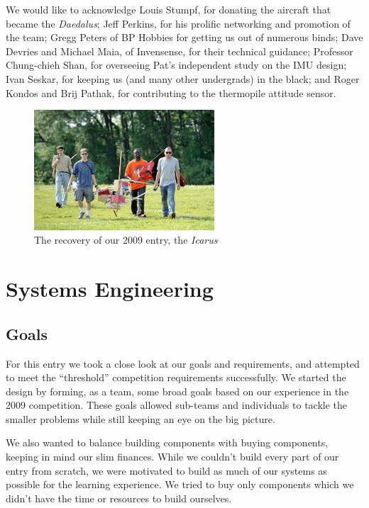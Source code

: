 \documentclass[10pt]{report}
\begin{document}
We would like to acknowledge
Louis Stumpf, for donating the aircraft that became the \emph{Daedalus};
Jeff Perkins, for his prolific networking and promotion of the team;
Gregg Peters of BP Hobbies for getting us out of numerous binds;
Dave Devries and Michael Maia, of Invensense, for their technical guidance;
Professor Chung-chieh Shan, for overseeing Pat's independent study on the IMU design;
Ivan Seskar, for keeping us (and many other undergrads) in the black; and
Roger Kondos and Brij Pathak, for contributing to the thermopile attitude sensor.

\begin{figure}[b!]
	\centering
	\includegraphics[width=0.6\textwidth]{../images/wreckage.jpg}
	\caption{The recovery of our 2009 entry, the \emph{Icarus}}
	\label{fig:wreckage}
\end{figure}

\newpage
\section{Systems Engineering}
\subsection{Goals}
For this entry we took a close look at our goals and requirements, and attempted to meet the ``threshold'' competition requirements successfully.
We started the design by forming, as a team, some broad goals based on our experience in the 2009 competition.
These goals allowed sub-teams and individuals to tackle the smaller problems while still keeping an eye on the big picture. 

We also wanted to balance building components with buying components, keeping in mind our slim finances. While we couldn't build every part of our entry from scratch, we were motivated to build as much of our systems as possible for the learning experience. We tried to buy only components which we didn't have the time or resources to build ourselves.
\end{document}
